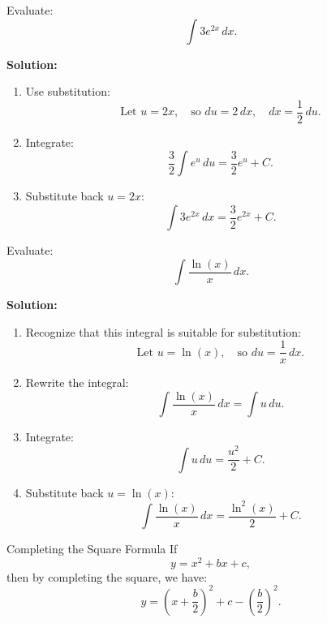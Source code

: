 \documentclass[12pt]{article}
\theoremstyle{beautifulthm}
\begin{document}
\begin{tcolorbox}[colback=examplebg, colframe=red!75!black, title=\textbf{EXAMPLE 3: Find the Integral of the Function}, fonttitle=\bfseries, sharp corners]
Evaluate:
\[
\int 3e^{2x} \, dx.
\]


\tcblower
\textbf{Solution:} 

\begin{enumerate}
    \item Use substitution:
    \[
    \text{Let } u = 2x, \quad \text{so } du = 2 \, dx, \quad dx = \frac{1}{2} \, du.
    \]
    \item Integrate:
    \[
    \frac{3}{2} \int e^u \, du = \frac{3}{2} e^u + C.
    \]
    \item Substitute back \( u = 2x \):
    \[
    \int 3e^{2x} \, dx = \frac{3}{2} e^{2x} + C.
    \]
\end{enumerate}

\end{tcolorbox}


\begin{tcolorbox}[colback=examplebg, colframe=red!75!black, title=\textbf{EXAMPLE 4: Find the Integral of the Function}, fonttitle=\bfseries, sharp corners]

Evaluate:
\[
\int \frac{\ln(x)}{x} \, dx.
\]

\tcblower
\textbf{Solution:} 
\begin{enumerate}
    \item Recognize that this integral is suitable for substitution:
    \[
    \text{Let } u = \ln(x), \quad \text{so } du = \frac{1}{x} \, dx.
    \]
    \item Rewrite the integral:
    \[
    \int \frac{\ln(x)}{x} \, dx = \int u \, du.
    \]
    \item Integrate:
    \[
    \int u \, du = \frac{u^2}{2} + C.
    \]
    \item Substitute back \( u = \ln(x) \):
    \[
    \int \frac{\ln(x)}{x} \, dx = \frac{\ln^2(x)}{2} + C.
    \]
\end{enumerate}
\end{tcolorbox}


\newpage

\begin{mytheorem}{Completing the Square Formula}{}
    If 
\[
y = x^2 + bx + c,
\]
then by completing the square, we have:
\[
y = \left(x + \frac{b}{2}\right)^2 + c - \left(\frac{b}{2}\right)^2.
\]
\end{mytheorem}
\end{document}
